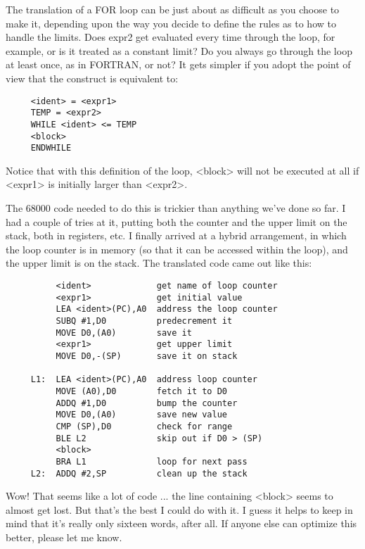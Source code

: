 The translation of a FOR loop  can  be just about as difficult as you choose  to  make  it, depending  upon  the way you decide to define  the rules as to how to handle the limits. Does expr2 get evaluated  every time through the loop, for  example, or  is  it treated as a constant limit?   Do  you always go through the loop at least once, as  in  FORTRAN, or  not? It gets simpler if you adopt the point of view that the construct is equivalent to:

\begin{verbatim}
     <ident> = <expr1>
     TEMP = <expr2>
     WHILE <ident> <= TEMP
     <block>
     ENDWHILE
\end{verbatim}

Notice that with this definition of the loop, <block> will not be executed at all if <expr1> is initially larger than <expr2>.

The 68000 code needed to do this is trickier than  anything we've done so far. I had a couple  of  tries  at  it, putting both the counter  and  the    upper limit on the stack, both in registers, etc. I  finally  arrived  at  a hybrid arrangement, in which the loop counter is in memory (so that it can be accessed  within the loop), and the upper limit is on the stack. The  translated code came out like this:

\begin{verbatim}
          <ident>             get name of loop counter
          <expr1>             get initial value
          LEA <ident>(PC),A0  address the loop counter
          SUBQ #1,D0          predecrement it
          MOVE D0,(A0)        save it
          <expr1>             get upper limit
          MOVE D0,-(SP)       save it on stack

     L1:  LEA <ident>(PC),A0  address loop counter
          MOVE (A0),D0        fetch it to D0
          ADDQ #1,D0          bump the counter
          MOVE D0,(A0)        save new value
          CMP (SP),D0         check for range
          BLE L2              skip out if D0 > (SP)
          <block>
          BRA L1              loop for next pass
     L2:  ADDQ #2,SP          clean up the stack
\end{verbatim}

Wow!  That  seems like a lot of code ... the  line  containing <block> seems to almost get lost. But that's the best I could do with it. I guess it helps to keep in mind that it's really only sixteen  words, after  all. If  anyone else can  optimize  this better, please let me know.


